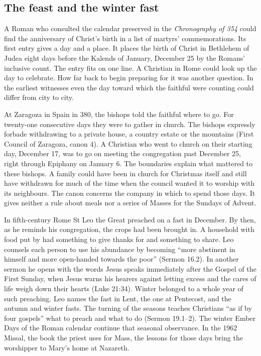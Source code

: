 \subsection{The feast and the winter fast}

A Roman who consulted the calendar preserved in the \emph{Chronography of
354} could find the anniversary of Christ's birth in a list of martyrs'
commemorations. Its first entry gives a day and a place. It places the birth of Christ in Bethlehem of Judea eight days before
the Kalends of January, December 25 by the Romans' inclusive count.
The entry fits on one line. A Christian in Rome could look up the day
to celebrate. How far back to begin preparing for it was another
question. In the earliest witnesses even the day toward which the
faithful were counting could differ from city to city.

At Zaragoza in Spain in 380, the bishops told the faithful where to go.
For twenty-one consecutive days they were to gather in church. The
bishops expressly forbade withdrawing to a private house, a country
estate or the mountains (First Council of Zaragoza, canon 4). A Christian
who went to church on their starting day, December 17, was to go on
meeting the congregation past December 25, right through Epiphany on
January 6.
The boundaries explain what mattered to these bishops. A family could
have been in church for Christmas itself and still have withdrawn for
much of the time when the council wanted it to worship with its neighbours.
The canon concerns the company in which to spend those days. It gives
neither a rule about meals nor a series of Masses for the Sundays of Advent.

In fifth-century Rome St Leo the Great preached on a fast in December. By
then, as he reminds his congregation, the crops had been brought in. A
household with food put by had something to give thanks for and something to
share. Leo counsels each person to use his abundance by becoming “more
abstinent in himself and more open-handed towards the poor” (Sermon 16.2). In
another sermon he opens with the words Jesus speaks immediately after the
Gospel of the First Sunday, when Jesus warns his hearers against letting
excess and the cares of life weigh down their hearts (Luke 21:34). Winter
belonged to a whole year of such preaching. Leo names the fast in Lent,
the one at Pentecost, and the autumn and winter fasts. The turning of
the seasons teaches Christians “as if by four gospels” what to preach
and what to do (Sermon 19.1--2). The winter Ember Days of the Roman
calendar continue that seasonal observance. In the 1962 Missal, the book the priest uses for Mass,
the lessons for those days bring the worshipper to Mary's home at Nazareth.

